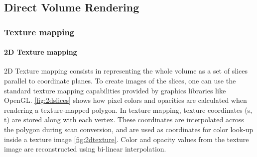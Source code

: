 \subsection{Direct Volume Rendering}

\subsubsection{Texture mapping}

\paragraph{2D Texture mapping}
2D Texture mapping consists in representing the whole volume as a set of slices parallel to coordinate planes. To create images of the slices, one can use the standard texture mapping capabilities provided by graphics libraries like OpenGL. \ref{fig:2dslices} shows how pixel colors and opacities are calculated when rendering a texture-mapped polygon. In texture mapping, texture coordinates (s, t) are stored along with each vertex. These coordinates are interpolated across the polygon during scan conversion, and are used as coordinates for color look-up inside a texture image \ref{fig:2dtexture}. Color and opacity values from the texture image are reconstructed using bi-linear interpolation.


